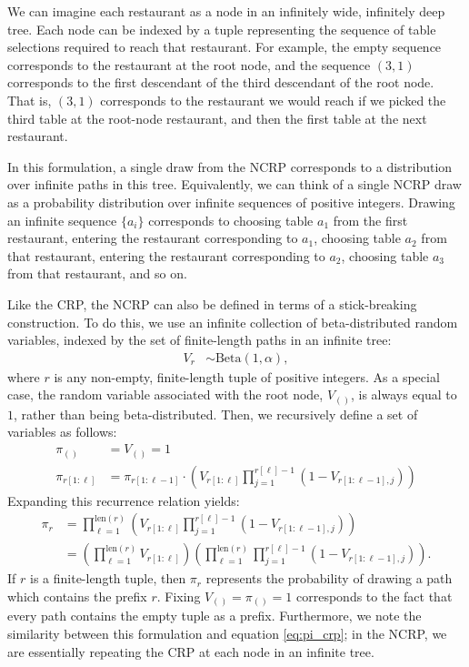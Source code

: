 \documentclass{article}
\newcommand{\len}{\mathrm{len}}
\begin{document}
We can imagine each restaurant as a node in an infinitely wide, infinitely deep tree.
Each node can be indexed by a tuple representing the sequence of table selections required to reach that restaurant.
For example, the empty sequence corresponds to the restaurant at the root node, and the sequence $(3, 1)$ corresponds to the first descendant of the third descendant of the root node.
That is, $(3, 1)$ corresponds to the restaurant we would reach if we picked the third table at the root-node restaurant, and then the first table at the next restaurant.

In this formulation, a single draw from the NCRP corresponds to a distribution over infinite paths in this tree.
Equivalently, we can think of a single NCRP draw as a probability distribution over infinite sequences of positive integers.
Drawing an infinite sequence $\{a_i\}$ corresponds to choosing table $a_1$ from the first restaurant, entering the restaurant corresponding to $a_1$, choosing table $a_2$ from that restaurant, entering the restaurant corresponding to $a_2$, choosing table $a_3$ from that restaurant, and so on.

Like the CRP, the NCRP can also be defined in terms of a stick-breaking construction.
To do this, we use an infinite collection of beta-distributed random variables, indexed by the set of finite-length paths in an infinite tree:
\begin{align}
V_r &\sim \text{Beta}(1, \alpha),
\end{align}
where $r$ is any non-empty, finite-length tuple of positive integers.
As a special case, the random variable associated with the root node, $V_{()}$, is always equal to $1$, rather than being beta-distributed.
Then, we recursively define a set of variables as follows:
\begin{align}
\pi_{()} &= V_{()} = 1 \\
\pi_{r[1:\ell]} &= \pi_{r[1:\ell-1]} \cdot \left( V_{r[1:\ell]} \prod_{j=1}^{r[\ell]-1} (1-V_{r[1:\ell-1],j}) \right)
\end{align}
Expanding this recurrence relation yields:
\begin{align}
\pi_r
&= \prod_{\ell = 1}^{\len(r)} \left( V_{r[1:\ell]} \prod_{j=1}^{r[\ell]-1} \left( 1 - V_{r[1:\ell-1],j} \right) \right) \\
&= \left( \prod_{\ell = 1}^{\len(r)} V_{r[1:\ell]} \right) \left( \prod_{\ell = 1}^{\len(r)} \prod_{j=1}^{r[\ell]-1} \left( 1 - V_{r[1:\ell-1],j} \right) \right).
\end{align}
If $r$ is a finite-length tuple, then $\pi_r$ represents the probability of drawing a path which contains the prefix $r$.
Fixing $V_{()} = \pi_{()} = 1$ corresponds to the fact that every path contains the empty tuple as a prefix.
Furthermore, we note the similarity between this formulation and equation \eqref{eq:pi_crp}; in the NCRP, we are essentially repeating the CRP at each node in an infinite tree.
\end{document}

